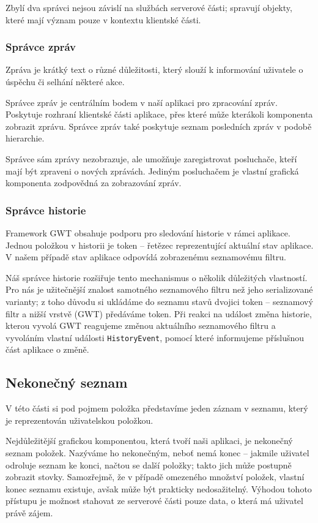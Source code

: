 \bigskip

Zbylí dva správci nejsou závislí na službách serverové části; spravují objekty, které mají význam pouze v kontextu klientské části.

\subsubsection{Správce zpráv}

Zpráva je krátký text o různé důležitosti, který slouží k informování uživatele o úspěchu či selhání některé akce.

Správce zpráv je centrálním bodem v naší aplikaci pro zpracování zpráv.
Poskytuje rozhraní klientské části aplikace, přes které může kterákoli komponenta zobrazit zprávu.
Správce zpráv také poskytuje seznam posledních zpráv v podobě hierarchie.

Správce sám zprávy nezobrazuje, ale umožňuje zaregistrovat posluchače, kteří mají být zpraveni o nových zprávách.
Jediným posluchačem je vlastní grafická komponenta zodpovědná za zobrazování zpráv.


\subsubsection{Správce historie}

Framework GWT obsahuje podporu pro sledování historie v rámci aplikace.
Jednou položkou v historii je token -- řetězec reprezentující aktuální stav aplikace.
V našem případě stav aplikace odpovídá zobrazenému seznamovému filtru.

Náš správce historie rozšiřuje tento mechanismus o několik důležitých vlastností.
Pro nás je užitečnější znalost samotného seznamového filtru než jeho serializované varianty; z toho důvodu si ukládáme do seznamu stavů dvojici token -- seznamový filtr a nižší vrstvě (GWT) předáváme token.
Při reakci na událost změna historie, kterou vyvolá GWT reagujeme změnou aktuálního seznamového filtru a vyvoláním vlastní události \verb|HistoryEvent|, pomocí které informujeme příslušnou část aplikace o změně.

\subsection{Nekonečný seznam}

V této části si pod pojmem položka představíme jeden záznam v seznamu, který je reprezentován uživatelskou položkou.

Nejdůležitější grafickou komponentou, která tvoří naši aplikaci, je nekonečný seznam položek.
Nazýváme ho nekonečným, neboť nemá konec – jakmile uživatel odroluje seznam ke konci, načtou se další položky; takto jich může postupně zobrazit stovky.
Samozřejmě, že v případě omezeného množství položek, vlastní konec seznamu existuje, avšak může být prakticky nedosažitelný.
Výhodou tohoto přístupu je možnost stahovat ze serverové části pouze data, o která má uživatel právě zájem.

